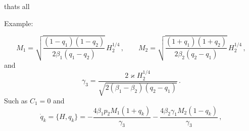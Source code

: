 thats all

Example:

\newcommand\g{{\gamma}}

\[
    M_1=\sqrt{\dfrac{(1-q_1)(1-q_2)}{2\beta_1(q_1-q_2)}}\,H_2^{1/4}\,,\qquad
M_2=\sqrt{\dfrac{(1+q_1)(1+q_2)}{2\beta_2(q_2-q_1)}}\,H_2^{1/4}\,,\]
and
\[
    \g_3=\dfrac{2\varkappa H_2^{1/4}}{\sqrt{2(\beta_1-\beta_2)(q_2-q_1)}}\,.
\]
Such as  $C_1=0$ and
\[
    \dot{q}_k=\{H,q_k\}=-\dfrac{4\beta_1p_2M_1(1+q_k)}{\g_3}-\dfrac{4\beta_2\g_1M_2(1-q_k)}{\g_3}\,,
\]



